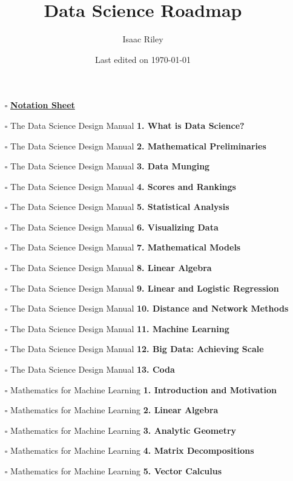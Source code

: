 \documentclass[a4, landscape, 12pt]{article}
\title{Data Science Roadmap}
\author{Isaac Riley}
\date{Last edited on \today}
\newcommand{\checkbox}{$\square$}%
\begin{document}
\maketitle
\begin{itemize}
\item [\checkbox]  \href{https://nthu-datalab.github.io/ml/slides/Notation.pdf}{\textbf{Notation Sheet}
}
\item [\checkbox]  The Data Science Design Manual \textbf{ 1. What is Data Science?
}
\item [\checkbox]  The Data Science Design Manual \textbf{ 2. Mathematical Preliminaries
}
\item [\checkbox]  The Data Science Design Manual \textbf{ 3. Data Munging
}
\item [\checkbox]  The Data Science Design Manual \textbf{ 4. Scores and Rankings
}
\item [\checkbox]  The Data Science Design Manual \textbf{ 5. Statistical Analysis
}
\item [\checkbox]  The Data Science Design Manual \textbf{ 6. Visualizing Data
}
\item [\checkbox]  The Data Science Design Manual \textbf{ 7. Mathematical Models
}
\item [\checkbox]  The Data Science Design Manual \textbf{ 8. Linear Algebra
}
\item [\checkbox]  The Data Science Design Manual \textbf{ 9. Linear and Logistic Regression
}
\item [\checkbox]  The Data Science Design Manual \textbf{ 10. Distance and Network Methods
}
\item [\checkbox]  The Data Science Design Manual \textbf{ 11. Machine Learning
}
\item [\checkbox]  The Data Science Design Manual \textbf{ 12. Big Data: Achieving Scale
}
\item [\checkbox]  The Data Science Design Manual \textbf{ 13. Coda
}
\item [\checkbox]  Mathematics for Machine Learning \textbf{ 1. Introduction and Motivation
}
\item [\checkbox]  Mathematics for Machine Learning \textbf{ 2. Linear Algebra
}
\item [\checkbox]  Mathematics for Machine Learning \textbf{ 3. Analytic Geometry
}
\item [\checkbox]  Mathematics for Machine Learning \textbf{ 4. Matrix Decompositions
}
\item [\checkbox]  Mathematics for Machine Learning \textbf{ 5. Vector Calculus
}
\end{itemize}
\end{document}
